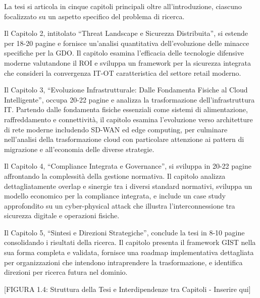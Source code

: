 \documentclass{report}
\begin{document}
La tesi si articola in cinque capitoli principali oltre
all'introduzione, ciascuno focalizzato su un aspetto specifico del
problema di ricerca.

Il Capitolo 2, intitolato ``Threat Landscape e Sicurezza Distribuita'',
si estende per 18-20 pagine e fornisce un'analisi quantitativa
dell'evoluzione delle minacce specifiche per la GDO. Il capitolo esamina
l'efficacia delle tecnologie difensive moderne valutandone il ROI e
sviluppa un framework per la sicurezza integrata che consideri la
convergenza IT-OT caratteristica del settore retail moderno.

Il Capitolo 3, ``Evoluzione Infrastrutturale: Dalle Fondamenta Fisiche
al Cloud Intelligente'', occupa 20-22 pagine e analizza la
trasformazione dell'infrastruttura IT. Partendo dalle fondamenta fisiche
essenziali come sistemi di alimentazione, raffreddamento e connettività,
il capitolo esamina l'evoluzione verso architetture di rete moderne
includendo SD-WAN ed edge computing, per culminare nell'analisi della
trasformazione cloud con particolare attenzione ai pattern di migrazione
e all'economia delle diverse strategie.

Il Capitolo 4, ``Compliance Integrata e Governance'', si sviluppa in
20-22 pagine affrontando la complessità della gestione normativa. Il
capitolo analizza dettagliatamente overlap e sinergie tra i diversi
standard normativi, sviluppa un modello economico per la compliance
integrata, e include un case study approfondito su un cyber-physical
attack che illustra l'interconnessione tra sicurezza digitale e
operazioni fisiche.

Il Capitolo 5, ``Sintesi e Direzioni Strategiche'', conclude la tesi in
8-10 pagine consolidando i risultati della ricerca. Il capitolo presenta
il framework GIST nella sua forma completa e validata, fornisce una
roadmap implementativa dettagliata per organizzazioni che intendono
intraprendere la trasformazione, e identifica direzioni per ricerca
futura nel dominio.

{[}FIGURA 1.4: Struttura della Tesi e Interdipendenze tra Capitoli -
Inserire qui{]}
\end{document}
